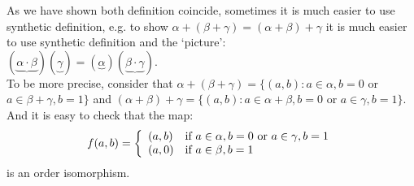 \begin{remark} As we have shown both definition coincide, sometimes it is
much easier to use synthetic definition, e.g. to show $\alpha + (\beta + \gamma) = (\alpha + \beta) + \gamma$ it is much easier to use synthetic definition and the `picture':\\
$(\underbrace{\alpha \cdot \beta})(\underbrace{\gamma}) = (\underbrace{\alpha})(\underbrace{\beta \cdot \gamma})$.\\
To be more precise, consider that $\alpha + (\beta + \gamma) = \{(a,b): a \in \alpha,b=0$ or $ a \in \beta + \gamma, b=1\}$ and $(\alpha + \beta) + \gamma = \{(a,b): a \in \alpha + \beta,b=0$ or $ a \in \gamma,b=1\}$. And it is easy to check that the map:
\begin{equation*}
f(a,b)= \left\{
\begin{array}{ll}
(a,b) & \text{if } a \in \alpha,b=0$ or $a \in \gamma,b=1\\
(a,0) & \text{if } a \in \beta, b=1 \\
\end{array} \right.
\end{equation*}
is an order isomorphism.
\end{remark}

